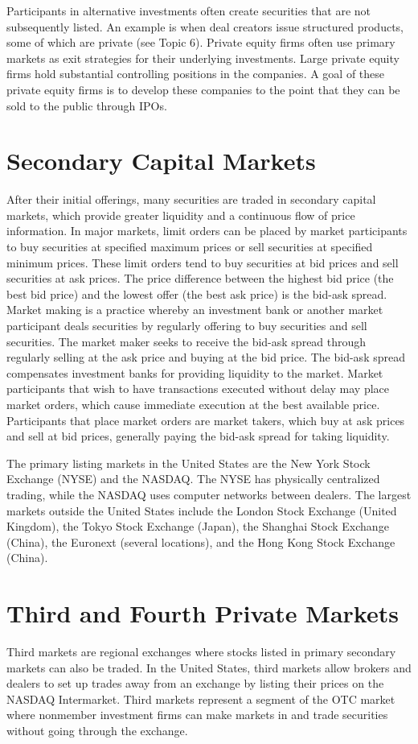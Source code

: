 \documentclass[11pt]{article}
\begin{document}
Participants in alternative investments often create securities that are not subsequently listed. An example is when deal creators issue structured products, some of which are private (see Topic 6). Private equity firms often use primary markets as exit strategies for their underlying investments. Large private equity firms hold substantial controlling positions in the companies. A goal of these private equity firms is to develop these companies to the point that they can be sold to the public through IPOs.

\section*{Secondary Capital Markets}
After their initial offerings, many securities are traded in secondary capital markets, which provide greater liquidity and a continuous flow of price information. In major markets, limit orders can be placed by market participants to buy securities at specified maximum prices or sell securities at specified minimum prices. These limit orders tend to buy securities at bid prices and sell securities at ask prices. The price difference between the highest bid price (the best bid price) and the lowest offer (the best ask price) is the bid-ask spread. Market making is a practice whereby an investment bank or another market participant deals securities by regularly offering to buy securities and sell securities. The market maker seeks to receive the bid-ask spread through regularly selling at the ask price and buying at the bid price. The bid-ask spread compensates investment banks for providing liquidity to the market. Market participants that wish to have transactions executed without delay may place market orders, which cause immediate execution at the best available price. Participants that place market orders are market takers, which buy at ask prices and sell at bid prices, generally paying the bid-ask spread for taking liquidity.

The primary listing markets in the United States are the New York Stock Exchange (NYSE) and the NASDAQ. The NYSE has physically centralized trading, while the NASDAQ uses computer networks between dealers. The largest markets outside the United States include the London Stock Exchange (United Kingdom), the Tokyo Stock Exchange (Japan), the Shanghai Stock Exchange (China), the Euronext (several locations), and the Hong Kong Stock Exchange (China).

\section*{Third and Fourth Private Markets}
Third markets are regional exchanges where stocks listed in primary secondary markets can also be traded. In the United States, third markets allow brokers and dealers to set up trades away from an exchange by listing their prices on the NASDAQ Intermarket. Third markets represent a segment of the OTC market where nonmember investment firms can make markets in and trade securities without going through the exchange.
\end{document}
